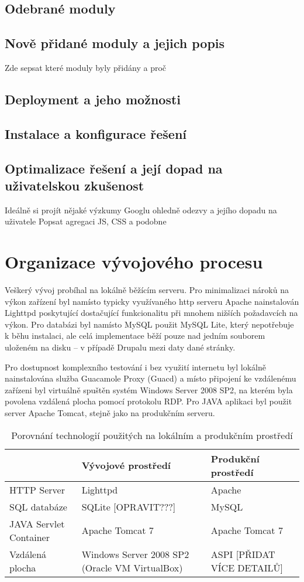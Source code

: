 \documentclass[10pt,draft,oneside]{fithesis2}
\begin{document}
\section{Odebrané moduly}

\section{Nově přidané moduly a jejich popis}
Zde sepsat které moduly byly přidány a proč

\section{Deployment a jeho možnosti}
\section{Instalace a konfigurace řešení}
\section{Optimalizace řešení a její dopad na uživatelskou zkušenost}
Ideálně si projít nějaké výzkumy Googlu ohledně odezvy a jejího dopadu na uživatele
Popsat agregaci JS, CSS a podobne 
\cite{website:drupal:optimizing}

\chapter{Organizace vývojového procesu}

Veškerý vývoj probíhal na lokálně běžícím serveru. Pro minimalizaci nároků na výkon zařízení byl namísto typicky využívaného http serveru Apache nainstalován Lighttpd poskytující dostačující funkcionalitu při mnohem nižších požadavcích na výkon. Pro databázi byl namísto MySQL použit MySQL Lite, který nepotřebuje k běhu instalaci, ale celá implementace běží pouze nad jedním souborem uloženém na disku – v případě Drupalu mezi daty dané stránky. 

Pro dostupnost komplexního testování i bez využití internetu byl lokálně nainstalována služba Guacamole Proxy (Guacd) a místo připojení ke vzdálenému zařízeni byl virtuálně spuštěn systém Windows Server 2008 SP2, na kterém byla povolena vzdálená plocha pomocí protokolu RDP. Pro JAVA aplikaci byl použit server Apache Tomcat, stejně jako na produkčním serveru.

\begin{table}
  \caption{Porovnání technologií použitých na lokálním a produkčním prostředí}
  \begin{tabular}{ | p{3cm} | p{4cm} | p{4cm} | }
    \hline  
    & Vývojové prostředí & Produkční prostředí \\ \hline
    HTTP Server & Lighttpd & Apache \\ \hline
    SQL databáze & SQLite [OPRAVIT???] & MySQL \\ \hline
    JAVA Servlet Container & Apache Tomcat 7 & Apache Tomcat 7 \\ \hline
    Vzdálená plocha & Windows Server 2008 SP2 (Oracle VM VirtualBox) & ASPI [PŘIDAT VÍCE DETAILŮ] \\ \hline
  \end{tabular}
\end{table}
\end{document}
